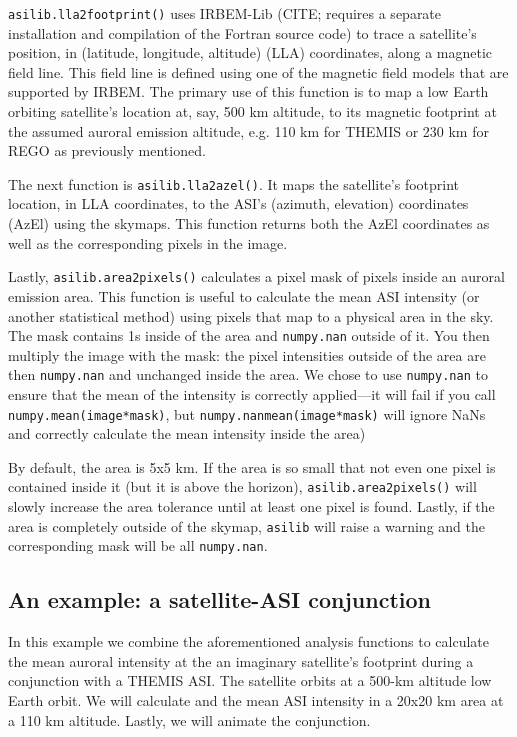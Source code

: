\documentclass[draft]{agujournal2019}
\begin{document}
\verb|asilib.lla2footprint()| uses IRBEM-Lib (CITE; requires a separate installation and compilation of the Fortran source code) to trace a satellite's position, in (latitude, longitude, altitude) (LLA) coordinates, along a magnetic field line. This field line is defined using one of the magnetic field models that are supported by IRBEM. The primary use of this function is to map a low Earth orbiting satellite's location at, say, 500 km altitude, to its magnetic footprint at the assumed auroral emission altitude, e.g. 110 km for THEMIS or 230 km for REGO as previously mentioned.

The next function is \verb|asilib.lla2azel()|. It maps the satellite's footprint location, in LLA coordinates, to the ASI's (azimuth, elevation) coordinates (AzEl) using the skymaps. This function returns both the AzEl coordinates as well as the corresponding pixels in the image.

Lastly, \verb|asilib.area2pixels()| calculates a pixel mask of pixels inside an auroral emission area. This function is useful to calculate the mean ASI intensity (or another statistical method) using pixels that map to a physical area in the sky. The mask contains 1s inside of the area and \verb|numpy.nan| outside of it. You then multiply the image with the mask: the pixel intensities outside of the area are then \verb|numpy.nan| and unchanged inside the area. We chose to use \verb|numpy.nan| to ensure that the mean of the intensity is correctly applied---it will fail if you call \verb|numpy.mean(image*mask)|, but \verb|numpy.nanmean(image*mask)| will ignore NaNs and correctly calculate the mean intensity inside the area)

By default, the area is 5x5 km. If the area is so small that not even one pixel is contained inside it (but it is above the horizon), \verb|asilib.area2pixels()| will slowly increase the area tolerance until at least one pixel is found. Lastly, if the area is completely outside of the skymap, \verb|asilib| will raise a warning and the corresponding mask will be all \verb|numpy.nan|. 

\subsection{An example: a satellite-ASI conjunction}\label{satellite_conjunction}
In this example we combine the aforementioned analysis functions to calculate the mean auroral intensity at the an imaginary satellite's footprint during a conjunction with a THEMIS ASI. The satellite orbits at a 500-km altitude low Earth orbit. We will calculate and the mean ASI intensity in a 20x20 km area at a 110 km altitude. Lastly, we will animate the conjunction.
\end{document}
